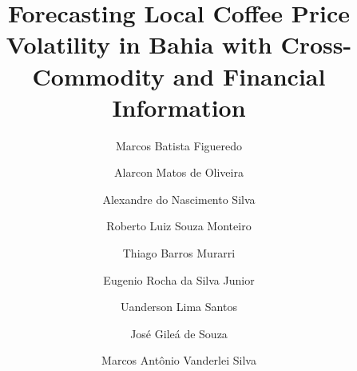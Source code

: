\documentclass[a4paper,fleqn]{cas-sc}
\begin{document}
\let\WriteBookmarks\relax
\def\floatpagepagefraction{1}
\def\textpagefraction{.001}



\title [mode = title]{Forecasting Local Coffee Price Volatility in Bahia with Cross-Commodity and Financial Information}

\author[1]{Marcos Batista Figueredo}
\cormark[1]
\author[1]{Alarcon Matos de Oliveira}
\author[1]{Alexandre do Nascimento Silva}
\author[1]{Roberto Luiz Souza Monteiro}
\author[2]{Thiago Barros Murarri}
\author[1]{Eugenio Rocha da Silva Junior}
\author[1]{Uanderson Lima Santos}
\author[1]{José Gileá de Souza}
\author[1]{Marcos Antônio Vanderlei Silva}




\end{document}
